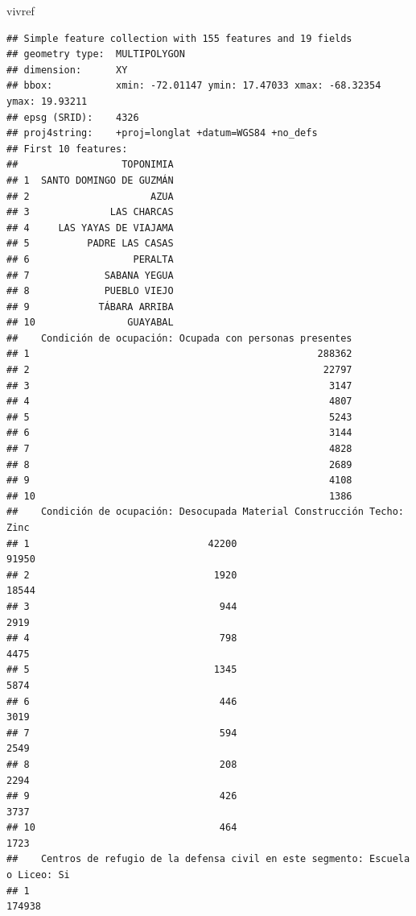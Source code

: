 \documentclass[11pt,]{article}
\newenvironment{Shaded}{\begin{snugshade}}{\end{snugshade}}
\newcommand{\NormalTok}[1]{#1}
\begin{document}
\begin{Shaded}
\begin{Highlighting}[]
\NormalTok{vivref}
\end{Highlighting}
\end{Shaded}

\begin{verbatim}
## Simple feature collection with 155 features and 19 fields
## geometry type:  MULTIPOLYGON
## dimension:      XY
## bbox:           xmin: -72.01147 ymin: 17.47033 xmax: -68.32354 ymax: 19.93211
## epsg (SRID):    4326
## proj4string:    +proj=longlat +datum=WGS84 +no_defs
## First 10 features:
##                  TOPONIMIA
## 1  SANTO DOMINGO DE GUZMÁN
## 2                     AZUA
## 3              LAS CHARCAS
## 4     LAS YAYAS DE VIAJAMA
## 5          PADRE LAS CASAS
## 6                  PERALTA
## 7             SABANA YEGUA
## 8             PUEBLO VIEJO
## 9            TÁBARA ARRIBA
## 10                GUAYABAL
##    Condición de ocupación: Ocupada con personas presentes
## 1                                                  288362
## 2                                                   22797
## 3                                                    3147
## 4                                                    4807
## 5                                                    5243
## 6                                                    3144
## 7                                                    4828
## 8                                                    2689
## 9                                                    4108
## 10                                                   1386
##    Condición de ocupación: Desocupada Material Construcción Techo: Zinc
## 1                               42200                             91950
## 2                                1920                             18544
## 3                                 944                              2919
## 4                                 798                              4475
## 5                                1345                              5874
## 6                                 446                              3019
## 7                                 594                              2549
## 8                                 208                              2294
## 9                                 426                              3737
## 10                                464                              1723
##    Centros de refugio de la defensa civil en este segmento: Escuela o Liceo: Si
## 1                                                                        174938

\end{verbatim}
\end{document}
